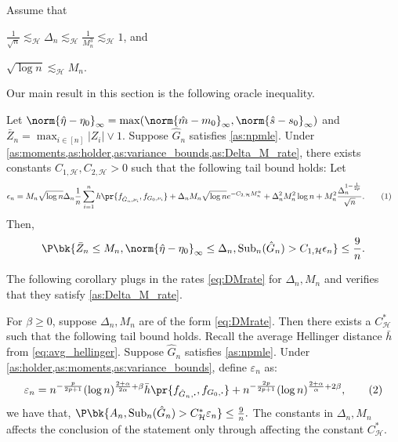 \documentclass[12pt, reqno]{amsart}
\newcommand\numberthis{\addtocounter{equation}{1}\tag{\theequation}}
\newcommand{\fs}[1]{f_{#1, \boldsymbol{\cdot}}}
\newcommand{\barh}{\bar h}
\newcommand{\Hyperparams}{\mathcal{H}}
\newcommand{\leH}{\lesssim_{\mathcal{H}}}
\newcommand{\hatm}{\hat m}
\newcommand{\hats}{\hat s}
\newcommand{\hateta}{\hat\eta}
\newcommand{\sub}{\mathrm{Sub}}
\newcommand{\Dinfty}{\norm{\hateta - \eta_0}_{\infty}} %
\numberwithin{equation}{section}
\begin{document}
\begin{refsection}
\begin{appendices}
\begin{as}
\label{as:Delta_M_rate}
Assume that
\begin{enumerate*}
    \item $\frac{1}{\sqrt n} \leH \Delta_n \leH
    \frac{1}{M_n^3} \leH 1$, and
    \item $\sqrt{\log n} \leH M_n$.
\end{enumerate*}
\end{as}
Our main result in this section is the following oracle inequality.
\begin{theorem}
\label{thm:suboptimality}
Let $\Dinfty = \max(\norm{\hatm - m_0}_\infty, \norm{\hats - s_0}_{\infty})$ and
$\bar Z_n = \max_{i\in [n]} |Z_i| \vee 1$. Suppose $\hat G_n$ satisfies \cref{as:npmle}.
Under \cref{as:moments,as:holder,as:variance_bounds,as:Delta_M_rate}, there exists
constants $C_{1,\Hyperparams}, C_{2, \Hyperparams} > 0$ such that the following tail bound
holds: Let \begin{align*}
\epsilon_n &= M_n \sqrt{\log n} \Delta_n \frac{1}{n}\sum_{i=1}^n h
\pr{f_
{\hat G_n, \nu_i}, f_{G_0, \nu_i}}
 + \Delta_n M_n \sqrt{\log n} e^{-C_{2, \Hyperparams} M_n^\alpha} +
 \Delta_n^2 M_n^2 \log n + M_n^2
 \frac{\Delta_n^{1-\frac{1}{2p}}}{\sqrt{n}}. \numberthis
 \label{eq:general_rate_sub}
\end{align*}
Then, \[
\P\bk{
    \bar Z_n \le M_n, \Dinfty \le \Delta_n, \sub_n(\hat G_n) > C_{1, \Hyperparams}
    \epsilon_n
} \le \frac{9}{n}.
\]
\end{theorem}

The following corollary plugs in the rates \eqref{eq:DMrate} for $\Delta_n, M_n$ and
verifies that they satisfy \cref{as:Delta_M_rate}.
\begin{cor}
\label{cor:suboptimality}
For $\beta \ge 0$, suppose $\Delta_n, M_n$ are of the form \eqref{eq:DMrate}. Then there
exists a $C_\Hyperparams^*$ such that the following tail bound holds. Recall the average
Hellinger distance $\barh$ from
  \eqref{eq:avg_hellinger}. Suppose $\hat G_n$ satisfies \cref{as:npmle}. Under 
  \cref{as:holder,as:moments,as:variance_bounds}, define
  $\varepsilon_n$
  as:
\[
\varepsilon_n = n^{-\frac{p}{2p+1}} (\log n)^{\frac{2 + \alpha}{2 \alpha} +
\beta} \barh
\pr{\fs{\hat G_n}, \fs{G_0}} + n^{-\frac{2p}{2p+1}} (\log n)^{\frac{2+\alpha}{\alpha} + 2 \beta
},
\numberthis
 \label{eq:specific_rate_sub}
  \]
  we have that, $
\P\bk{
    A_n, \sub_n(\hat G_n) > C_{\Hyperparams}^*
    \varepsilon_n
} \le \frac{9}{n}.
$
The constants  in $\Delta_n, M_n$ affects the conclusion of the statement only through
affecting the constant $C_{\Hyperparams}^*$.
\end{cor}


\end{appendices}
\end{refsection}
\end{document}
